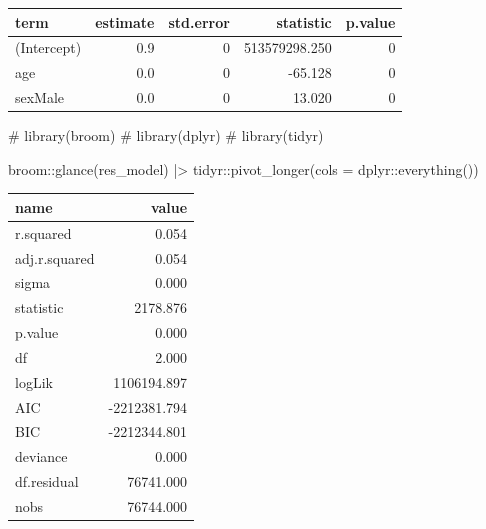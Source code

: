 \documentclass[
  12pt,
  a4paper,
  oneside]{tesesusp}
\newenvironment{Shaded}{\begin{snugshade}}{\end{snugshade}}
\newcommand{\AttributeTok}[1]{\textcolor[rgb]{0.40,0.45,0.13}{#1}}
\newcommand{\CommentTok}[1]{\textcolor[rgb]{0.37,0.37,0.37}{#1}}
\newcommand{\FunctionTok}[1]{\textcolor[rgb]{0.28,0.35,0.67}{#1}}
\newcommand{\NormalTok}[1]{\textcolor[rgb]{0.00,0.23,0.31}{#1}}
\newcommand{\SpecialCharTok}[1]{\textcolor[rgb]{0.37,0.37,0.37}{#1}}
\begin{document}
\begin{table}
\centering
\begin{tabular}{l|r|r|r|r}
\hline
term & estimate & std.error & statistic & p.value\\
\hline
(Intercept) & 0.9 & 0 & 513579298.250 & 0\\
\hline
age & 0.0 & 0 & -65.128 & 0\\
\hline
sexMale & 0.0 & 0 & 13.020 & 0\\
\hline
\end{tabular}
\end{table}

\begin{Shaded}
\begin{Highlighting}[numbers=left,,]
\CommentTok{\# library(broom)}
\CommentTok{\# library(dplyr)}
\CommentTok{\# library(tidyr)}

\NormalTok{broom}\SpecialCharTok{::}\FunctionTok{glance}\NormalTok{(res\_model) }\SpecialCharTok{|\textgreater{}}\NormalTok{ tidyr}\SpecialCharTok{::}\FunctionTok{pivot\_longer}\NormalTok{(}\AttributeTok{cols =}\NormalTok{ dplyr}\SpecialCharTok{::}\FunctionTok{everything}\NormalTok{())}
\end{Highlighting}
\end{Shaded}

\begin{table}
\centering
\begin{tabular}{l|r}
\hline
name & value\\
\hline
r.squared & 0.054\\
\hline
adj.r.squared & 0.054\\
\hline
sigma & 0.000\\
\hline
statistic & 2178.876\\
\hline
p.value & 0.000\\
\hline
df & 2.000\\
\hline
logLik & 1106194.897\\
\hline
AIC & -2212381.794\\
\hline
BIC & -2212344.801\\
\hline
deviance & 0.000\\
\hline
df.residual & 76741.000\\
\hline
nobs & 76744.000\\
\hline
\end{tabular}
\end{table}
\end{document}
